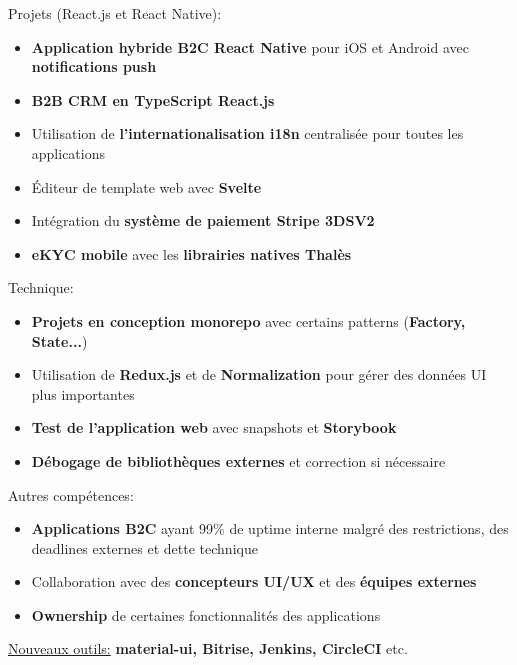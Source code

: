 \documentclass[10pt,a4paper,ragged2e,withhyper]{altacv}
\begin{document}
\vspace{-.5\baselineskip}
\begin{minipage}[t]{0.45\textwidth}
  \vspace{0pt}
  Projets (React.js et React Native):
  \begin{itemize}
    \item \textbf{Application hybride B2C React Native} pour iOS et Android avec \textbf{notifications push}
    \item \textbf{B2B CRM en TypeScript React.js}
    \item Utilisation de \textbf{l'internationalisation i18n} centralisée pour toutes les applications
    \item Éditeur de template web avec \textbf{Svelte}
    \item Intégration du \textbf{système de paiement Stripe 3DSV2}
    \item \textbf{eKYC mobile} avec les \textbf{librairies natives Thalès}
  \end{itemize}
\end{minipage}
\hfill
\begin{minipage}[t]{0.45\textwidth}
  \vspace{0pt}
  Technique:
  \begin{itemize}
    \item \textbf{Projets en conception monorepo} avec certains patterns (\textbf{Factory, State...})
    \item Utilisation de \textbf{Redux.js} et de \textbf{Normalization} pour gérer des données UI plus importantes
    \item \textbf{Test de l'application web} avec snapshots et \textbf{Storybook}
    \item \textbf{Débogage de bibliothèques externes} et correction si nécessaire
  \end{itemize}
\end{minipage}

\bigskip
Autres compétences:
\begin{itemize}
  \item \textbf{Applications B2C} ayant 99\% de uptime interne malgré des restrictions, des deadlines externes et dette technique
  \item Collaboration avec des \textbf{concepteurs UI/UX} et des \textbf{équipes externes}
  \item \textbf{Ownership} de certaines fonctionnalités des applications
\end{itemize}
\begin{itshape}
  \underline{Nouveaux outils:}
  \small{\textbf{material-ui, Bitrise, Jenkins, CircleCI} etc.}
\end{itshape}
\end{document}
